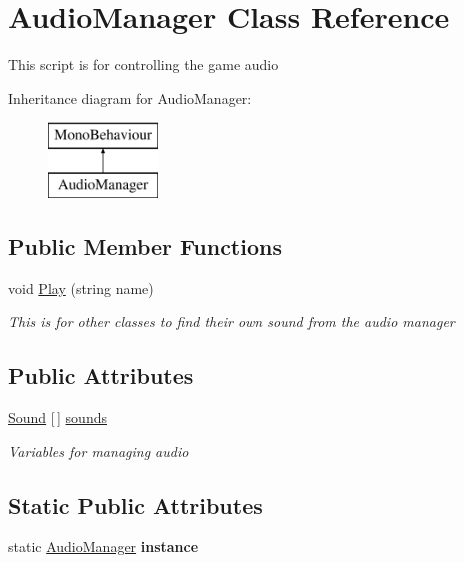 \hypertarget{class_audio_manager}{}\section{Audio\+Manager Class Reference}
\label{class_audio_manager}


This script is for controlling the game audio  


Inheritance diagram for Audio\+Manager\+:\begin{figure}[H]
\begin{center}
\leavevmode
\includegraphics[height=2.000000cm]{class_audio_manager}
\end{center}
\end{figure}
\subsection*{Public Member Functions}
\begin{DoxyCompactItemize}
\item 
void \mbox{\hyperlink{class_audio_manager_a51d560f729b1fd4d6b5ce83ca558deb2}{Play}} (string name)
\begin{DoxyCompactList}\small\item\em This is for other classes to find their own sound from the audio manager \end{DoxyCompactList}\end{DoxyCompactItemize}
\subsection*{Public Attributes}
\begin{DoxyCompactItemize}
\item 
\mbox{\hyperlink{class_sound}{Sound}} \mbox{[}$\,$\mbox{]} \mbox{\hyperlink{class_audio_manager_a66e04092f8cca2c8432893159a08ea56}{sounds}}
\begin{DoxyCompactList}\small\item\em Variables for managing audio \end{DoxyCompactList}\end{DoxyCompactItemize}
\subsection*{Static Public Attributes}
\begin{DoxyCompactItemize}
\item 
\mbox{\label{class_audio_manager_a22b1b1a94ee423ccb2b142b4f5a70ad4}} 
static \mbox{\hyperlink{class_audio_manager}{Audio\+Manager}} {\bfseries instance}
\end{DoxyCompactItemize}
